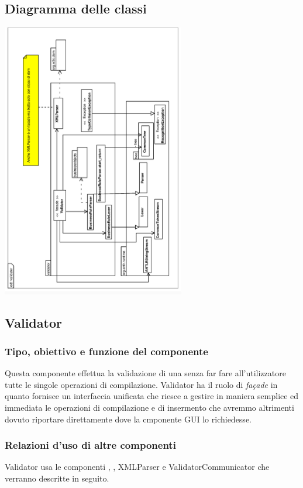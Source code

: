\documentclass[11pt,titlepage,a4paper]{report}
\begin{document}
\subsection{Diagramma delle classi}
\begin{center}
\includegraphics[width=0.6\textwidth, angle=-90]{DiagrammaClassi/validator.eps}
\end{center}
\subsection{Validator}%
\subsubsection{Tipo, obiettivo e funzione del componente}
Questa componente effettua la validazione di una \br senza far fare all'utilizzatore tutte le singole operazioni di compilazione.
Validator ha il ruolo di \textit{fa\c{c}ade} in quanto fornisce un interfaccia unificata che riesce a gestire in maniera semplice ed immediata le operazioni di compilazione e di insermento che avremmo altrimenti dovuto riportare direttamente dove la cmponente GUI lo richiedesse.
\subsubsection{Relazioni d'uso di altre componenti}
Validator usa le componenti \brp, \brl, XMLParser e ValidatorCommunicator che verranno descritte in seguito.
\end{document}
